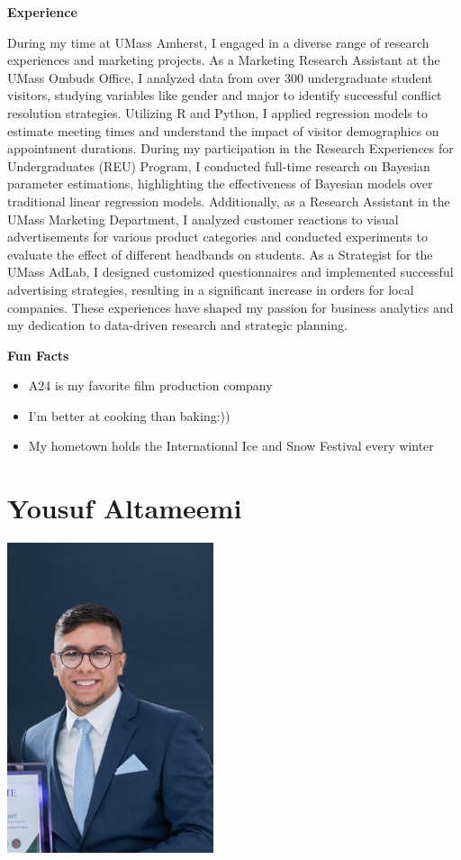 \documentclass[
]{book}
\begin{document}
\textbf{Experience}

During my time at UMass Amherst, I engaged in a diverse range of research experiences and marketing projects. As a Marketing Research Assistant at the UMass Ombuds Office, I analyzed data from over 300 undergraduate student visitors, studying variables like gender and major to identify successful conflict resolution strategies. Utilizing R and Python, I applied regression models to estimate meeting times and understand the impact of visitor demographics on appointment durations. During my participation in the Research Experiences for Undergraduates (REU) Program, I conducted full-time research on Bayesian parameter estimations, highlighting the effectiveness of Bayesian models over traditional linear regression models. Additionally, as a Research Assistant in the UMass Marketing Department, I analyzed customer reactions to visual advertisements for various product categories and conducted experiments to evaluate the effect of different headbands on students. As a Strategist for the UMass AdLab, I designed customized questionnaires and implemented successful advertising strategies, resulting in a significant increase in orders for local companies. These experiences have shaped my passion for business analytics and my dedication to data-driven research and strategic planning.

\textbf{Fun Facts}

\begin{itemize}
\item
  A24 is my favorite film production company
\item
  I'm better at cooking than baking:))
\item
  My hometown holds the International Ice and Snow Festival every winter
\end{itemize}

\hypertarget{yousuf-altameemi}{%
\section{Yousuf Altameemi}\label{yousuf-altameemi}}

\includegraphics[width=2.38542in,height=\textheight]{Headshot.jpg}
\end{document}
